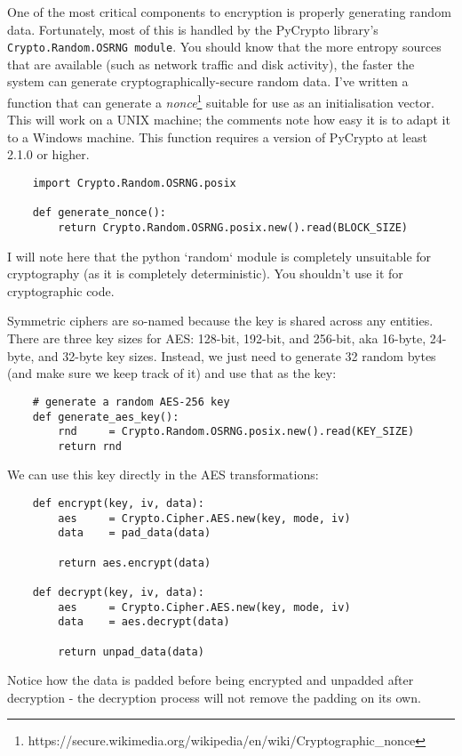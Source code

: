 \documentclass[letterpaper,10pt]{article}
\begin{document}
One of the most critical components to encryption is properly generating 
random data. Fortunately, most of this is handled by the PyCrypto library's
\verb|Crypto.Random.OSRNG module|. You should know that the more entropy sources
that are available (such as network traffic and disk activity), the faster the system
can generate cryptographically-secure random data. I've written a function that 
can generate a \textit{nonce}\footnote{https://secure.wikimedia.org/wikipedia/en/wiki/Cryptographic\_nonce} 
suitable for use as an initialisation vector. This will work on a UNIX machine; 
the comments note how easy it is to adapt it to a Windows machine. This 
function requires a version of PyCrypto at least 2.1.0 or higher.
\begin{verbatim}
    import Crypto.Random.OSRNG.posix

    def generate_nonce():
        return Crypto.Random.OSRNG.posix.new().read(BLOCK_SIZE)

\end{verbatim}
I will note here that the python `random` module is completely unsuitable for
cryptography (as it is completely deterministic). You shouldn't use it for
cryptographic code.

Symmetric ciphers are so-named because the key is shared across any
entities.  There are three key sizes for AES: 128-bit, 192-bit, and
256-bit, aka 16-byte, 24-byte, and 32-byte key sizes. Instead, we just
need to generate 32 random bytes (and make sure we keep track of it)
and use that as the key:

\begin{verbatim}
    # generate a random AES-256 key
    def generate_aes_key():
        rnd     = Crypto.Random.OSRNG.posix.new().read(KEY_SIZE)
        return rnd
\end{verbatim}

We can use this key directly in the AES transformations:
\begin{verbatim}
    def encrypt(key, iv, data):
        aes     = Crypto.Cipher.AES.new(key, mode, iv)
        data    = pad_data(data)

        return aes.encrypt(data)

    def decrypt(key, iv, data):
        aes     = Crypto.Cipher.AES.new(key, mode, iv)
        data    = aes.decrypt(data)

        return unpad_data(data)
\end{verbatim}

Notice how the data is padded before being encrypted and unpadded after 
decryption - the decryption process will not remove the padding on its own.
\end{document}
